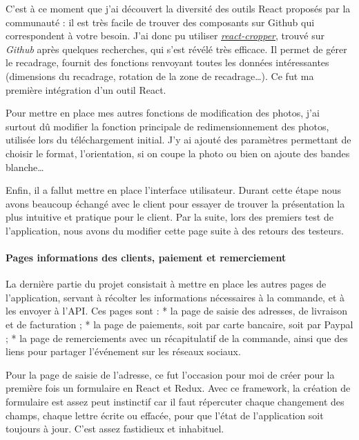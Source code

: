 \documentclass[12pt,a4paper]{article}
\begin{document}
  \bigskip

  C'est à ce moment que j'ai découvert la diversité des outils React
  proposés par la communauté : il est très facile de trouver des
  composants sur Github qui correspondent à votre besoin. J'ai donc pu
  utiliser
  \href{https://github.com/roadmanfong/react-cropper}{\emph{react-cropper}},
  trouvé sur \emph{Github} après quelques recherches, qui s'est révélé
  très efficace. Il permet de gérer le recadrage, fournit des fonctions
  renvoyant toutes les données intéressantes (dimensions du recadrage,
  rotation de la zone de recadrage\ldots{}). Ce fut ma première
  intégration d'un outil React.

  \bigskip

  Pour mettre en place mes autres fonctions de modification des photos,
  j'ai surtout dû modifier la fonction principale de redimensionnement des
  photos, utilisée lors du téléchargement initial. J'y ai ajouté des
  paramètres permettant de choisir le format, l'orientation, si on coupe
  la photo ou bien on ajoute des bandes blanche\ldots{}

  \bigskip

  Enfin, il a fallut mettre en place l'interface utilisateur. Durant cette
  étape nous avons beaucoup échangé avec le client pour essayer de trouver
  la présentation la plus intuitive et pratique pour le client. Par la
  suite, lors des premiers test de l'application, nous avons du modifier
  cette page suite à des retours des testeurs.

  \paragraph{Pages informations des clients, paiement et
  remerciement}\label{pages-informations-des-clients-paiement-et-remerciement}

  \bigskip

  La dernière partie du projet consistait à mettre en place les autres
  pages de l'application, servant à récolter les informations nécessaires
  à la commande, et à les envoyer à l'API. Ces pages sont : * la page de
  saisie des adresses, de livraison et de facturation ; * la page de
  paiements, soit par carte bancaire, soit par Paypal ; * la page de
  remerciements avec un récapitulatif de la commande, ainsi que des liens
  pour partager l'événement sur les réseaux sociaux.

  \bigskip

  Pour la page de saisie de l'adresse, ce fut l'occasion pour moi de créer
  pour la première fois un formulaire en React et Redux. Avec ce
  framework, la création de formulaire est assez peut instinctif car il
  faut répercuter chaque changement des champs, chaque lettre écrite ou
  effacée, pour que l'état de l'application soit toujours à jour. C'est
  assez fastidieux et inhabituel.
\end{document}
